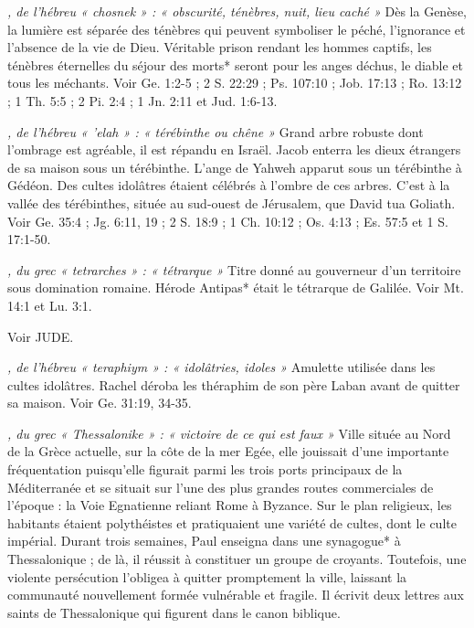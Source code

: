 \begin{multicols}{2}
{\textit{, de l'hébreu « chosnek » : « obscurité, ténèbres, nuit, lieu caché »}\newline
Dès la Genèse, la lumière est séparée des ténèbres qui peuvent symboliser le péché, l'ignorance et l'absence de la vie de Dieu. Véritable prison rendant les hommes captifs, les ténèbres éternelles du séjour des morts* seront pour les anges déchus, le diable et tous les méchants. Voir Ge. 1:2-5 ; 2 S. 22:29 ; Ps. 107:10 ; Job. 17:13 ; Ro. 13:12 ; 1 Th. 5:5 ; 2 Pi. 2:4 ; 1 Jn. 2:11 et Jud. 1:6-13.

\textit{, de l'hébreu « 'elah » : « térébinthe ou chêne »}\newline
Grand arbre robuste dont l'ombrage est agréable, il est répandu en Israël. Jacob enterra les dieux étrangers de sa maison sous un térébinthe. L'ange de Yahweh apparut sous un térébinthe à Gédéon. Des cultes idolâtres étaient célébrés à l'ombre de ces arbres. C'est à la vallée des térébinthes, située au sud-ouest de Jérusalem, que David tua Goliath. Voir Ge. 35:4 ; Jg. 6:11, 19 ; 2 S. 18:9 ; 1 Ch. 10:12 ; Os. 4:13 ; Es. 57:5 et 1 S. 17:1-50.

\textit{, du grec « tetrarches » : « tétrarque »}\newline
Titre donné au gouverneur d'un territoire sous domination romaine. Hérode Antipas* était le tétrarque de Galilée. Voir Mt. 14:1 et Lu. 3:1.

\textit{}\newline
Voir JUDE.

\textit{, de l'hébreu « teraphiym » : « idolâtries, idoles »}\newline
Amulette utilisée dans les cultes idolâtres. Rachel déroba les théraphim de son père Laban avant de quitter sa maison. Voir Ge. 31:19, 34-35.

\textit{, du grec « Thessalonike » : « victoire de ce qui est faux »}\newline
Ville située au Nord de la Grèce actuelle, sur la côte de la mer Egée, elle jouissait d'une importante fréquentation puisqu'elle figurait parmi les trois ports principaux de la Méditerranée et se situait sur l'une des plus grandes routes commerciales de l'époque : la Voie Egnatienne reliant Rome à Byzance. Sur le plan religieux, les habitants étaient polythéistes et pratiquaient une variété de cultes, dont le culte impérial. Durant trois semaines, Paul enseigna dans une synagogue* à Thessalonique ; de là, il réussit à constituer un groupe de croyants. Toutefois, une violente persécution l'obligea à quitter promptement la ville, laissant la communauté nouvellement formée vulnérable et fragile. Il écrivit deux lettres aux saints de Thessalonique qui figurent dans le canon biblique.

}
\end{multicols}
